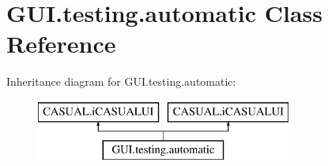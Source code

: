 \hypertarget{class_g_u_i_1_1testing_1_1automatic}{\section{G\-U\-I.\-testing.\-automatic Class Reference}
\label{class_g_u_i_1_1testing_1_1automatic}
}
Inheritance diagram for G\-U\-I.\-testing.\-automatic\-:\begin{figure}[H]
\begin{center}
\leavevmode
\includegraphics[height=2.000000cm]{class_g_u_i_1_1testing_1_1automatic}
\end{center}
\end{figure}
